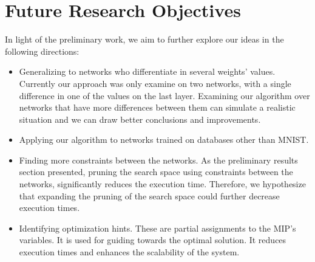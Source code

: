 

\section{Future Research Objectives}
In light of the preliminary work, we aim to further explore our ideas in the following directions:
\begin{itemize}
    \item Generalizing to networks who differentiate in several weights' values. Currently our approach was only examine on two networks, with a single difference in one of the values on the last layer. Examining our algorithm over networks that have more differences between them can simulate a realistic situation and we can draw better conclusions and improvements.
    \item Applying our algorithm to networks trained on databases other than MNIST.
    \item Finding more constraints between the networks. As the preliminary results section presented, pruning the search space using constraints between the networks, significantly reduces the execution time. Therefore, we hypothesize that expanding the pruning of the search space could further decrease execution times.
    \item Identifying optimization hints. These are partial assignments to the MIP’s variables. It is used for guiding towards the optimal solution. It reduces execution times and enhances the scalability of the system.
\end{itemize}
